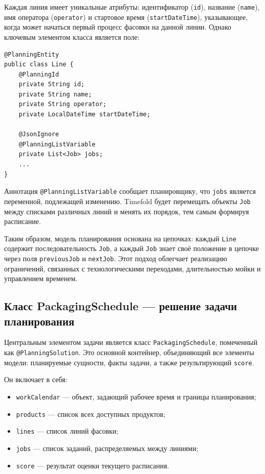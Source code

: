 Каждая линия имеет уникальные атрибуты: идентификатор (\texttt{id}), название (\texttt{name}), имя оператора (\texttt{operator}) и стартовое время (\texttt{startDateTime}), указывающее, когда может начаться первый процесс фасовки на данной линии. Однако ключевым элементом класса является поле:

\begin{lstlisting}[caption={Класс Line}, label={lst:classLine}]
@PlanningEntity
public class Line {
    @PlanningId
    private String id;
    private String name;
    private String operator;
    private LocalDateTime startDateTime;

    @JsonIgnore
    @PlanningListVariable
    private List<Job> jobs;
    ...
}
\end{lstlisting}

Аннотация \texttt{@PlanningListVariable} сообщает планировщику, что \texttt{jobs} является переменной, подлежащей изменению. Timefold будет перемещать объекты \texttt{Job} между списками различных линий и менять их порядок, тем самым формируя расписание.

Таким образом, модель планирования основана на цепочках: каждый \texttt{Line} содержит последовательность \texttt{Job}, а каждый \texttt{Job} знает своё положение в цепочке через поля \texttt{previousJob} и \texttt{nextJob}. Этот подход облегчает реализацию ограничений, связанных с технологическими переходами, длительностью мойки и управлением временем.

\subsection*{Класс PackagingSchedule — решение задачи планирования}

Центральным элементом задачи является класс \texttt{PackagingSchedule}, помеченный как \texttt{@PlanningSolution}. Это основной контейнер, объединяющий все элементы модели: планируемые сущности, факты задачи, а также результирующий \texttt{score}.

Он включает в себя:

\begin{itemize}
    \item \texttt{workCalendar} — объект, задающий рабочее время и границы планирования;
    \item \texttt{products} — список всех доступных продуктов;
    \item \texttt{lines} — список линий фасовки;
    \item \texttt{jobs} — список заданий, распределяемых между линиями;
    \item \texttt{score} — результат оценки текущего расписания.
\end{itemize}

